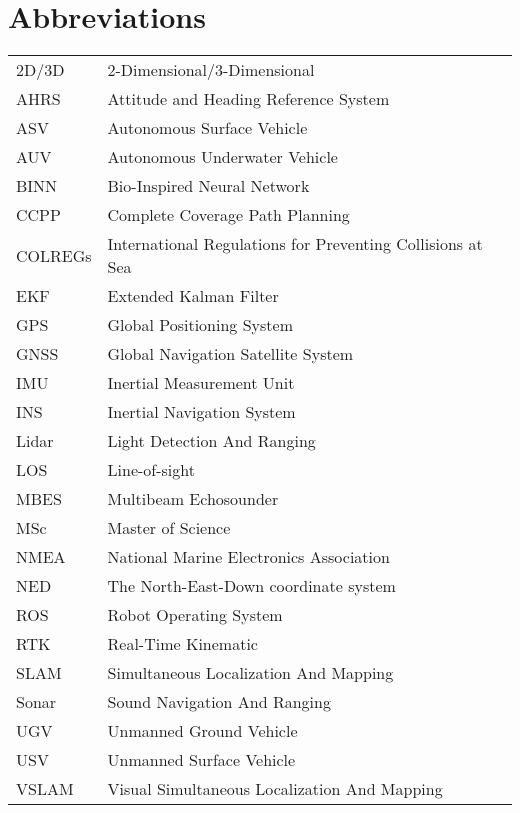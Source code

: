 \chapter*{Abbreviations}

\noindent 
\begin{center}
\begin{longtable}{ p{} p{} }
	2D/3D  & 2-Dimensional/3-Dimensional \\ 
	AHRS & Attitude and Heading Reference System \\
	ASV  & Autonomous Surface Vehicle \\
	AUV  & Autonomous Underwater Vehicle \\
	BINN  & Bio-Inspired Neural Network \\
	CCPP  & Complete Coverage Path Planning \\
	COLREGs & International Regulations for Preventing Collisions at Sea \\ 
	EKF  & Extended Kalman Filter \\
	GPS  & Global Positioning System \\
	GNSS & Global Navigation Satellite System \\
	IMU  & Inertial Measurement Unit \\
	INS & Inertial Navigation System \\
	Lidar & Light Detection And Ranging \\
	LOS  & Line-of-sight \\
	MBES & Multibeam Echosounder \\
	MSc & Master of Science \\
	NMEA & National Marine Electronics Association \\
	NED  & The North-East-Down coordinate system \\
	ROS  & Robot Operating System \\
	RTK & Real-Time Kinematic \\
   	SLAM  & Simultaneous Localization And Mapping \\
   	Sonar & Sound Navigation And Ranging \\
	UGV  & Unmanned Ground Vehicle \\	
	USV  & Unmanned Surface Vehicle \\
	VSLAM  & Visual Simultaneous Localization And Mapping \\
   
\end{longtable}
\end{center}

\clearpage

\pagestyle{headings}